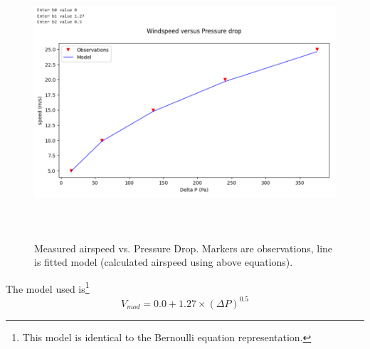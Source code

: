 \documentclass[12pt]{article}
\begin{document}
\begin{figure}[h!] %
   \centering
   \includegraphics[height=4in]{Fitted.png} 
   \caption{Measured airspeed vs. Pressure Drop.  Markers are observations, line is fitted model (calculated airspeed using above equations).}
   \label{fig:pressure}
\end{figure}

The model used is\footnote{This model is identical to the Bernoulli equation representation.}
\begin{equation}
V_{mod}=0.0+1.27\times(\Delta P)^{0.5}
\end{equation}
\end{document}
